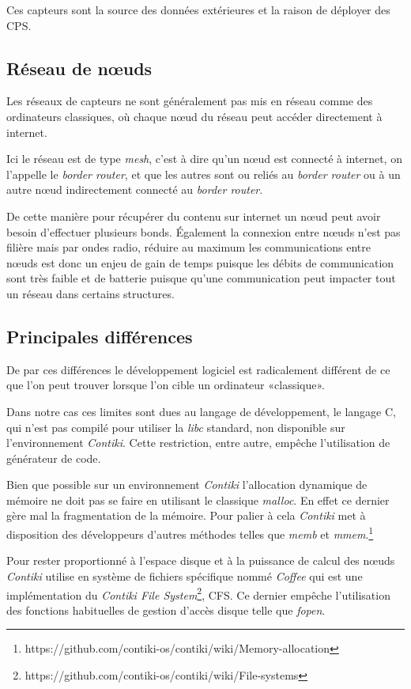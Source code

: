 Ces capteurs sont la source des données extérieures et la raison de déployer des CPS.

\subsection{Réseau de nœuds}

Les réseaux de capteurs ne sont généralement pas mis en réseau comme des ordinateurs classiques, où chaque nœud du réseau peut accéder directement à internet.

Ici le réseau est de type \emph{mesh}, c'est à dire qu'un nœud est connecté à internet, on l'appelle le \emph{border router}, et que les autres sont ou reliés au \emph{border router} ou à un autre nœud indirectement connecté au \emph{border router}.


De cette manière pour récupérer du contenu sur internet un nœud peut avoir besoin d'effectuer plusieurs bonds. Également la connexion entre nœuds n'est pas filière mais par ondes radio, réduire au maximum les communications entre nœuds est donc un enjeu de gain de temps puisque les débits de communication sont très faible et de batterie puisque qu'une communication peut impacter tout un réseau dans certains structures.

\subsection{Principales différences}

De par ces différences le développement logiciel est radicalement différent de ce que l'on peut trouver lorsque l'on cible un ordinateur «classique».

Dans notre cas ces limites sont dues au langage de développement, le langage C, qui n'est pas compilé pour utiliser la \emph{libc} standard, non disponible sur l'environnement \emph{Contiki}. Cette restriction, entre autre, empêche l'utilisation de générateur de code.

Bien que possible sur un environnement \emph{Contiki} l'allocation dynamique de mémoire ne doit pas se faire en utilisant le classique \emph{malloc}. En effet ce dernier gère mal la fragmentation de la mémoire. Pour palier à cela \emph{Contiki} met à disposition des développeurs d'autres méthodes telles que \emph{memb} et \emph{mmem}.\footnote{https://github.com/contiki-os/contiki/wiki/Memory-allocation}

Pour rester proportionné à l'espace disque et à la puissance de calcul des nœuds \emph{Contiki} utilise en système de fichiers spécifique nommé \emph{Coffee} qui est une  implémentation du \emph{Contiki File System}\footnote{https://github.com/contiki-os/contiki/wiki/File-systems}, CFS. Ce dernier empêche l'utilisation des fonctions habituelles de gestion d'accès disque telle que \emph{fopen}.


